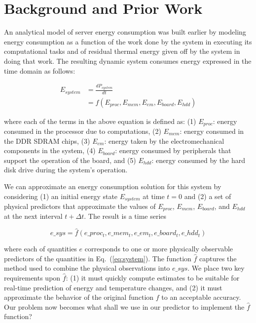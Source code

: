 \documentclass[times,10pt,finalversion]{usetex-v1}
\begin{document}
\section{Background and Prior Work}
\label{sec:priorwork}
An analytical model of server energy consumption was built earlier
\cite{Lewis2008} by modeling energy consumption as a function of the
work done by the system in executing its computational tasks and of
residual thermal energy given off by the system in doing that work.  The
resulting dynamic system consumes energy expressed in the time domain as
follows:
\begin{small}
{\setlength{\abovedisplayskip}{2pt plus 2pt minus 2pt}
 \setlength{\belowdisplayskip}{2pt plus 2pt minus 2pt}
\begin{align}
  \label{eq:system}
  E_{system}&=\frac{d{P_{system}}}{d{t}}\nonumber\\
           &=f(E_{proc},E_{mem},E_{em},E_{board},E_{hdd})
\end{align}
}
\end{small}
where each of the terms in the above equation is defined as: (1)
$E_{proc}$: energy consumed in the processor due to computations, (2)
$E_{mem}$: energy consumed in the DDR SDRAM chips, (3) $E_{em}$: energy taken by the
electromechanical components in the system, (4) $E_{board}$:
energy consumed by peripherals that support the operation of the board,
and (5) $E_{hdd}$: energy consumed by the hard disk
drive during the system's operation.

We can approximate an energy consumption solution for this system by
considering (1) an initial energy state $E_{system}$ at time $t=0$ and
(2) a set of physical predictors that approximate the values of
$E_{proc}$, $E_{mem}$, $E_{board}$, and $E_{hdd}$ at the next interval
$t+\Delta t$.  The result is a time series
\begin{small}
{\setlength{\abovedisplayskip}{2pt plus 2pt minus 2pt}
 \setlength{\belowdisplayskip}{2pt plus 2pt minus 2pt}
\begin{equation}
\label{eq:tseries}
e\_sys=\hat{f}(e\_proc_{t},e\_mem_{t},e\_em_{t},e\_board_{t},e\_hdd_{t})
\end{equation}
}\end{small}
where each of quantities $e$ corresponds to one or more physically
observable predictors of the quantities in Eq.~(\ref{eq:system}). The
function $\hat{f}$ captures the method used to combine the physical
observations into $e\_sys$.  We place two key requirements upon
$\hat{f}$: (1) it must quickly compute estimates to be suitable for
real-time prediction of energy and temperature changes, and (2) it must
approximate the behavior of the original function $f$ to an acceptable
accuracy.  Our problem now becomes what shall we use in our predictor to
implement the $\hat{f}$ function?
\end{document}
